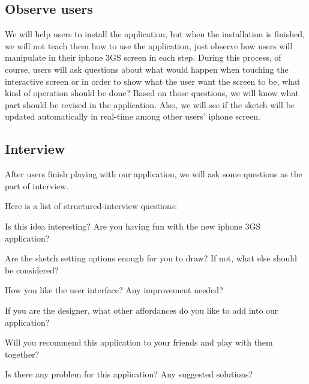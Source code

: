 \documentclass{article}
\begin{document}
\subsection{Observe users}
We will help users to install the application, but when the installation is finished, we will not teach them how to use the application, just observe how users will manipulate in their iphone 3GS screen in each step. During this process, of course, users will ask questions about what would happen when touching the interactive screen or in order to show what the user want the screen to be, what kind of operation should be done? Based on those questions, we will know what part should be revised in the application. Also, we will see if the sketch will be updated automatically in real-time among other users' iphone screen.

\subsection{Interview}

After users finish playing with our application, we will ask some questions as the part of interview.

Here is a list of structured-interview questions:

Is this idea interesting? Are you having fun with the new iphone 3GS application?

Are the sketch setting options enough for you to draw? If not, what else should be considered?

How you like the user interface? Any improvement needed?

If you are the designer, what other affordances do you like to add into our application?

Will you recommend this application to your friends and play with them together?

Is there any problem for this application? Any suggested solutions?
 

 
\end{document}
